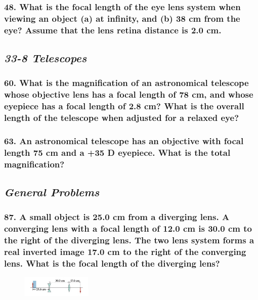 \documentclass{article}
\begin{document}
\subsubsection*{
    48. What is the focal length of the eye lens system when viewing an object (a) at infinity, and (b) 38 cm
    from the eye? Assume that the lens retina distance is 2.0 cm.
}
\newpage
\begin{center}
    \subsection*{\textbf{\textit{33-8 Telescopes}}}
\end{center}
\subsubsection*{
    60. What is the magnification of an astronomical telescope whose objective lens has a focal length of 78 cm,
    and whose eyepiece has a focal length of 2.8 cm? What is the overall length of the telescope when adjusted
    for a relaxed eye?
}
\subsubsection*{
    63. An astronomical telescope has an objective with focal length 75 cm and a +35 D eyepiece. What is the
    total magnification?
}
\newpage
\begin{center}
    \subsection*{\textbf{\textit{General Problems}}}
\end{center}
\subsubsection*{
    87. A small object is 25.0 cm from a diverging lens. A converging lens with a focal length of 12.0 cm is
    30.0 cm to the right of the diverging lens. The two lens system forms a real inverted image 17.0 cm to the
    right of the converging lens. What is the focal length of the diverging lens?
}
\begin{figure}[h]
    \begin{center}
        \includegraphics[width=0.3\textwidth]{figures/p87.png}
    \end{center}
\end{figure}
\end{document}
